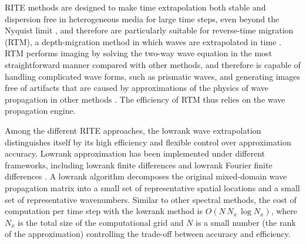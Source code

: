 RITE methods are designed to make time extrapolation both stable and dispersion free in heterogeneous media for large time steps, even beyond the Nyquist limit \cite[]{rite}, and therefore are particularly suitable for reverse-time migration (RTM), a depth-migration method in which waves are extrapolated in time \cite[]{baysal,McMechan,whitmore,gxt,fletcher,fowlerrtm}. RTM performs imaging by solving the two-way wave equation in the most straightforward manner compared with other methods, and therefore is capable of handling complicated wave forms, such as prismatic waves, and generating images free of artifacts that are caused by approximations of the physics of wave propagation in other methods \cite[]{etgen09,leveille11}. The efficiency of RTM thus relies on the wave propagation engine.

Among the different RITE approaches, the lowrank wave extrapolation \cite[]{lowrankabs,lowrank} distinguishes itself by its high efficiency and flexible control over approximation accuracy. Lowrank approximation has been implemented under different frameworks, including lowrank finite differences and lowrank Fourier finite differences \cite[]{song,fang14}. A lowrank algorithm decomposes the original mixed-domain wave propagation matrix into a small set of representative spatial locations and a small set of representative wavenumbers. Similar to other spectral methods, the cost of computation per time step with the lowrank method is $O(N\,N_x\,\log{N_x})$, where $N_x$ is the total size of the computational grid and $N$ is a small number (the rank of the approximation) controlling the trade-off between accuracy and efficiency. 


